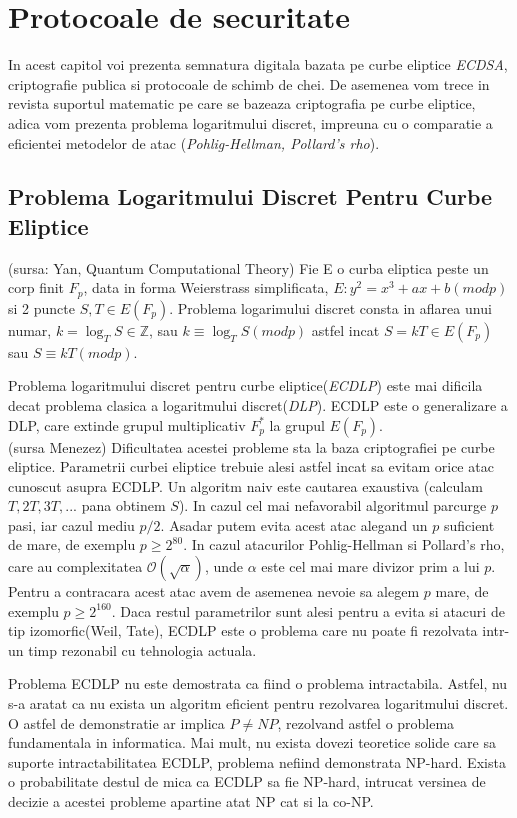 \chapter{Protocoale de securitate} 

In acest capitol voi prezenta semnatura digitala bazata pe curbe eliptice \textit{ECDSA}, criptografie publica si protocoale de schimb de chei. De asemenea vom trece in revista suportul matematic pe care se bazeaza criptografia pe curbe eliptice, adica vom prezenta problema logaritmului discret, impreuna cu o comparatie a eficientei metodelor de atac (\textit{Pohlig-Hellman, Pollard's rho}).

\section{Problema Logaritmului Discret Pentru Curbe Eliptice}
\label{sec:sec01}

\begin{dfn}
(sursa: Yan, Quantum Computational Theory)
Fie E o curba eliptica peste un corp finit $F_p$, data in forma Weierstrass simplificata, 
$E: y^2 = x^3 + ax + b (mod p)$ si 2 puncte $S, T\in E(F_p)$. Problema logarimului discret consta in aflarea unui numar, $k = \log_T S \in \mathbb{Z}$, sau $k \equiv \log_T S (mod p)$ astfel incat $S = kT \in E(F_p)$ sau $S \equiv kT (mod p)$. 
\end{dfn}

Problema logaritmului discret pentru curbe eliptice(\textit{ECDLP}) este mai dificila decat problema clasica a logaritmului discret(\textit{DLP}). ECDLP este o generalizare a DLP, care extinde grupul multiplicativ $F^{*}_{p}$ la grupul $E(F_p)$.
\\(sursa Menezez) Dificultatea acestei probleme sta la baza criptografiei pe curbe eliptice. Parametrii curbei eliptice trebuie alesi astfel incat sa evitam orice atac cunoscut asupra ECDLP. Un algoritm naiv este cautarea exaustiva (calculam $T, 2T, 3T, ...$ pana obtinem $S$). In cazul cel mai nefavorabil algoritmul parcurge $p$ pasi, iar cazul mediu $p/2$. Asadar putem evita acest atac alegand un $p$ suficient de mare, de exemplu $p\geq 2^{80}$. In cazul atacurilor Pohlig-Hellman si Pollard's rho, care au complexitatea $\mathcal{O}(\sqrt{\alpha})$, unde $\alpha$ este cel mai mare divizor prim a lui $p$. Pentru a contracara acest atac avem de asemenea nevoie sa alegem $p$ mare, de exemplu $p\geq 2^{160}$. Daca restul parametrilor sunt alesi pentru a evita si atacuri de tip izomorfic(Weil, Tate), ECDLP este o problema care nu poate fi rezolvata intr-un timp rezonabil cu tehnologia actuala.

\begin{obs}
Problema ECDLP nu este demostrata ca fiind o problema intractabila. Astfel, nu s-a aratat ca nu exista un algoritm eficient pentru rezolvarea logaritmului discret. O astfel de demonstratie ar implica $P\neq NP$, rezolvand astfel o problema fundamentala in informatica. Mai mult, nu exista dovezi teoretice solide care sa suporte intractabilitatea ECDLP, problema nefiind demonstrata NP-hard. Exista o probabilitate destul de mica ca ECDLP sa fie NP-hard, intrucat versinea de decizie a acestei probleme apartine atat NP cat si la co-NP.
\end{obs}